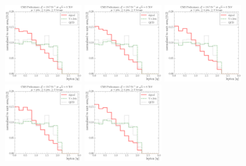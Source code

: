 \begin{figure}[!htbp]
  \centering
    {\includegraphics[width=0.3\textwidth]{measurement/ST/central/fit_templates/muon_templates_bin_0-350}}
    {\includegraphics[width=0.3\textwidth]{measurement/ST/central/fit_templates/muon_templates_bin_350-400}}
    {\includegraphics[width=0.3\textwidth]{measurement/ST/central/fit_templates/muon_templates_bin_400-450}}\\
    {\includegraphics[width=0.3\textwidth]{measurement/ST/central/fit_templates/muon_templates_bin_450-500}}
    {\includegraphics[width=0.3\textwidth]{measurement/ST/central/fit_templates/muon_templates_bin_500-580}}

\end{figure}
